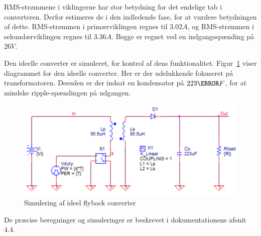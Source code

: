 RMS-strømmene i viklingerne har stor betydning for det endelige tab i converteren. Derfor estimeres de i den indledende fase, for at vurdere betydningen af dette. RMS-strømmen i primærviklingen regnes til $3.02A$, og RMS-strømmen i sekundærviklingen regnes til $3.36A$. Begge er regnet ved en indgangsspænding på $26V$. 

Den ideelle converter er simuleret, for kontrol af dens funktionalitet. Figur~\ref{fig:flyabck_ideal_diagram} viser diagrammet for den ideelle converter. Her er der udelukkende fokuseret på transformatoren. Desuden er der indsat en kondensator på $223\micro F$, for at mindske ripple-spændingen på udgangen. 

\begin{figure}[H]
	\centering
	\includegraphics[width=0.7\linewidth]{../Dokumentation/tex/1iteration/billeder/flyback_ideal_diagram.png}
	\caption{Simulering af ideel flyback converter}
	\label{fig:flyabck_ideal_diagram}
\end{figure}

\noindent De præcise beregninger og simuleringer er beskrevet i dokumentationens afsnit 4.4.







